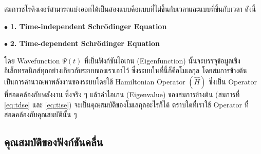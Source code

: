 สมการชโรดิงเงอร์สามารถแบ่งออกได้เป็นสองแบบคือแบบที่ไม่ขึ้นกับเวลาและแบบที่ขึ้นกับเวลา ดังนี้

\noindent $\bullet$ \textbf{1. Time-independent Schr\"{o}dinger Equation}


\noindent $\bullet$ \textbf{2. Time-dependent Schr\"{o}dinger Equation}


โดย Wavefunction $\Psi(t)$ ที่เป็นฟังก์ชันไอเกน (Eigenfunction) นั้นจะบรรจุข้อมูลเชิงอิเล็กทรอนิกส์ทุกอย่างเกี่ยวกับระบบของเราเอาไว้\autocite{szabo1996,cramer2004,jensen2017} ซึ่งระบบในที่นี้ก็คือโมเลกุล โดยสมการข้างต้นเป็นการคำนวณหาพลังงานของระบบโดยใช้ Hamiltonian Operator $(\hat{H})$ ซึ่งเป็น Operator ที่สอดคล้องกับพลังงาน ซึ่งจริง ๆ แล้วค่าไอเกน (Eigenvalue) ของสมการข้างต้น (สมการที่ \eqref{eq:tdse} และ \eqref{eq:tise}) จะเป็นคุณสมบัติของโมเลกุลอะไรก็ได้ ตราบใดที่เราใช้ Operator ที่สอดคล้องกับคุณสมบัตินั้น ๆ

\subsection{คุณสมบัติของฟังก์ชันคลื่น}
\label{ssec:wavefunc_prop}

